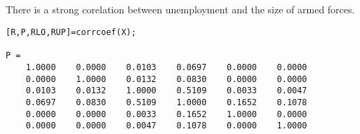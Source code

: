 \documentclass[12pt]{article}
\begin{document}
\subsection{} %
There is a strong corelation between unemployment and the size of armed forces.

\begin{minipage}{\linewidth}
\begin{lstlisting}
[R,P,RLO,RUP]=corrcoef(X);

P =
    1.0000    0.0000    0.0103    0.0697    0.0000    0.0000
    0.0000    1.0000    0.0132    0.0830    0.0000    0.0000
    0.0103    0.0132    1.0000    0.5109    0.0033    0.0047
    0.0697    0.0830    0.5109    1.0000    0.1652    0.1078
    0.0000    0.0000    0.0033    0.1652    1.0000    0.0000
    0.0000    0.0000    0.0047    0.1078    0.0000    1.0000
\end{lstlisting}
\end{minipage}

\subsection{} %
\end{document}
